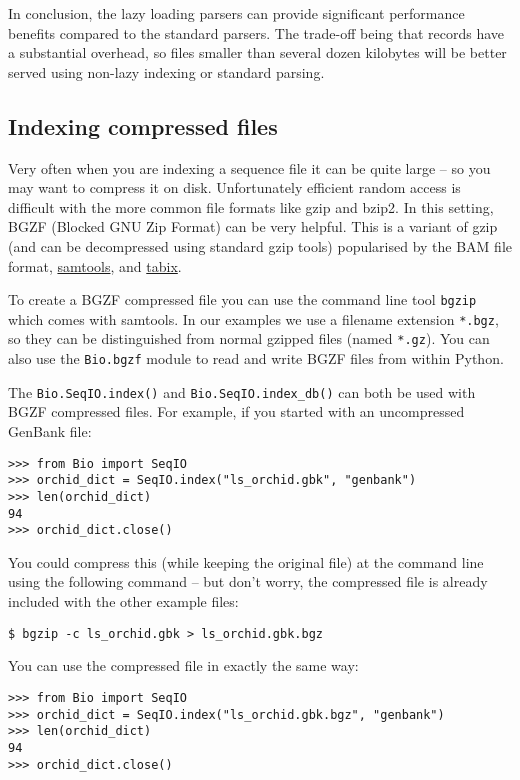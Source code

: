 \documentclass{report}
\begin{document}
In conclusion, the lazy loading parsers can provide significant performance
benefits compared to the standard parsers. The trade-off being that records
have a substantial overhead, so files smaller than several dozen kilobytes
will be better served using non-lazy indexing or standard parsing.

\subsection{Indexing compressed files}
\label{sec:SeqIO-index-bgzf}

Very often when you are indexing a sequence file it can be quite large -- so
you may want to compress it on disk. Unfortunately efficient random access
is difficult with the more common file formats like gzip and bzip2. In this
setting, BGZF (Blocked GNU Zip Format) can be very helpful. This is a variant
of gzip (and can be decompressed using standard gzip tools) popularised by
the BAM file format, \href{http://samtools.sourceforge.net/}{samtools}, and
\href{http://samtools.sourceforge.net/tabix.shtml}{tabix}.

To create a BGZF compressed file you can use the command line tool \verb|bgzip|
which comes with samtools. In our examples we use a filename extension
\verb|*.bgz|, so they can be distinguished from normal gzipped files (named
\verb|*.gz|). You can also use the \verb|Bio.bgzf| module to read and write
BGZF files from within Python.

The \verb|Bio.SeqIO.index()| and \verb|Bio.SeqIO.index_db()| can both be
used with BGZF compressed files. For example, if you started with an
uncompressed GenBank file:

\begin{verbatim}
>>> from Bio import SeqIO
>>> orchid_dict = SeqIO.index("ls_orchid.gbk", "genbank")
>>> len(orchid_dict)
94
>>> orchid_dict.close()
\end{verbatim}

You could compress this (while keeping the original file) at the command
line using the following command -- but don't worry, the compressed file
is already included with the other example files:

\begin{verbatim}
$ bgzip -c ls_orchid.gbk > ls_orchid.gbk.bgz
\end{verbatim}

You can use the compressed file in exactly the same way:

\begin{verbatim}
>>> from Bio import SeqIO
>>> orchid_dict = SeqIO.index("ls_orchid.gbk.bgz", "genbank")
>>> len(orchid_dict)
94
>>> orchid_dict.close()
\end{verbatim}
\end{document}
